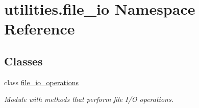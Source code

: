 \hypertarget{namespaceutilities_1_1file__io}{}\section{utilities.\+file\+\_\+io Namespace Reference}
\label{namespaceutilities_1_1file__io}
\subsection*{Classes}
\begin{DoxyCompactItemize}
\item 
class \hyperlink{classutilities_1_1file__io_1_1file__io__operations}{file\+\_\+io\+\_\+operations}
\begin{DoxyCompactList}\small\item\em Module with methods that perform file I/\+O operations. \end{DoxyCompactList}\end{DoxyCompactItemize}
